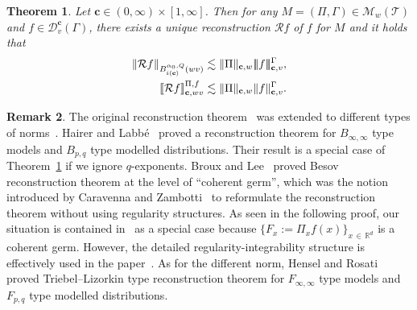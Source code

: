 \documentclass[10pt]{amsart}
\newtheorem{theo}{Theorem}[section]
\theoremstyle{definition}
\newtheorem{rema}[theo]{Remark}
\numberwithin{equation}{section}
\newcommand{\bbR}{\mathbb{R}}
\newcommand{\bfc}{\mathbf{c}}
\newcommand{\mcD}{\mathcal{D}}
\newcommand{\mcR}{\mathcal{R}}
\newcommand{\scT}{\mathscr{T}}
\newcommand{\scM}{\mathscr{M}}
\newcommand{\tri}{|\!|\!|}
\newcommand{\llbracket}{\mathopen{[\mkern -2.7mu[}}
\newcommand{\rrbracket}{\mathclose{]\mkern -2.7mu]}}
\newcommand{\lb}{\llbracket}
\newcommand{\rb}{\rrbracket}
\begin{document}
\begin{theo}\label{thm:besovreconstruction}
Let $\bfc\in(0,\infty)\times[1,\infty]$. Then for any $M=(\Pi,\Gamma)\in\scM_{w}(\scT)$ and $f\in\mcD_{v}^\bfc(\Gamma)$, there exists a unique reconstruction $\mcR f$ of $f$ for $M$ and it holds that
\begin{align}\label{besovreconstruction}
\|\mcR f\|_{B_{i(\bfc)}^{\alpha_0,Q}(wv)}&\lesssim\|\Pi\|_{\bfc,w}\tri f\tri_{\bfc,v}^\Gamma,\\\label{besovreconstructioncharacterize}
\lb\mcR f\rb_{\bfc,wv}^{\Pi,f}&\lesssim \|\Pi\|_{\bfc,w}\|f\|_{\bfc,v}^\Gamma.
\end{align}
\end{theo}
\begin{rema}
The original reconstruction theorem~\cite[Theorem~3.10]{Hai14} was extended to different types of norms~\cite{BL22,HL17, HR20}. Hairer and Labbé~\cite{HL17} proved a reconstruction theorem for $B_{\infty,\infty}$ type models and $B_{p,q}$ type modelled distributions. Their result is a special case of Theorem~\ref{thm:besovreconstruction} if we ignore $q$-exponents. Broux and Lee~\cite{BL22} proved Besov reconstruction theorem at the level of ``coherent germ'', which was the notion introduced by Caravenna and Zambotti~\cite{CZ20} to reformulate the reconstruction theorem without using regularity structures. As seen in the following proof, our situation is contained in~\cite{BL22} as a special case because $\{F_x:=\Pi_xf(x)\}_{x\,\in\,\bbR^d}$ is a coherent germ. However, the detailed regularity-integrability structure is effectively used in the paper~\cite{BPHZ}. As for the different norm, Hensel and Rosati~\cite{HR20} proved Triebel--Lizorkin type reconstruction theorem for $F_{\infty,\infty}$ type models and $F_{p,q}$ type modelled distributions.
\end{rema}
\end{document}
